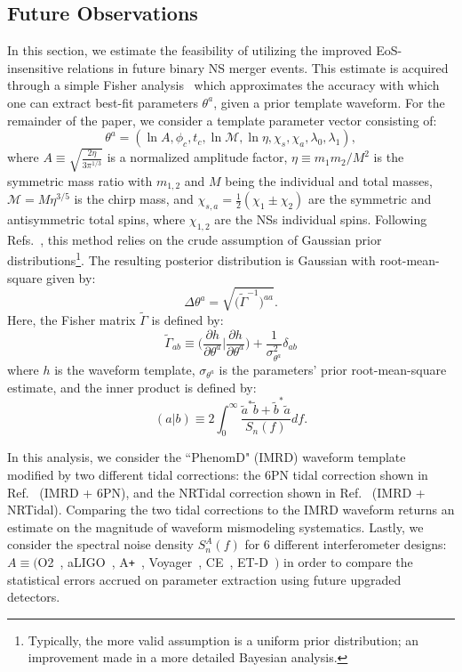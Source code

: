 \documentclass[prd,twocolumn,nofootinbib,superscriptaddress,amsmath,amssymb]{revtex4-1}
\begin{document}
\subsection{Future Observations}\label{sec:futureObservations}
In this section, we estimate the feasibility of utilizing the improved EoS-insensitive relations in future binary NS merger events.
This estimate is acquired through a simple Fisher analysis~\cite{Finn:Fisher,Cutler:Fisher} which approximates the accuracy with which one can extract best-fit parameters $\theta^a$, given a prior template waveform.
For the remainder of the paper, we consider a template parameter vector consisting of:
\begin{equation}\label{eq:template}
\theta^a=(\ln{A},\phi_c,t_c,\ln{\mathcal{M}},\ln{\mathcal{\eta}},\chi_s,\chi_a,\lambda_0, \lambda_1),
\end{equation}
where $A \equiv \sqrt{\frac{2 \eta}{3 \pi^{1/3}}}$ is a normalized amplitude factor, $\eta \equiv m_1 m_2/M^2$ is the symmetric mass ratio with $m_{1,2}$ and $M$ being the individual and total masses, $\mathcal{M}=M \eta^{3/5}$ is the chirp mass, and $\chi_{s,a}=\frac{1}{2}(\chi_1\pm\chi_2)$ are the symmetric and antisymmetric total spins, where $\chi_{1,2}$ are the NSs individual spins. 
Following Refs.~\cite{Cutler:Fisher,Berti:Fisher,Poisson:Fisher}, this method relies on the crude assumption of Gaussian prior distributions\footnote{Typically, the more valid assumption is a uniform prior distribution; an improvement made in a more detailed Bayesian analysis.}.
The resulting posterior distribution is Gaussian with root-mean-square given by:
\begin{equation}
\Delta \theta^a=\sqrt{\Big( \tilde{\Gamma}^{-1}\Big)^{aa}}.
\end{equation}
Here, the Fisher matrix $\tilde{\Gamma}$ is defined by:
\begin{equation}
\tilde{\Gamma}_{ab} \equiv \Big( \frac{\partial h}{\partial \theta^a} \Big| \frac{\partial h}{\partial \theta^a}\Big) + \frac{1}{\sigma_{\theta^a}^2} \delta_{ab}
\end{equation}
where $h$ is the waveform template, $\sigma_{\theta^a}$ is the parameters' prior root-mean-square estimate, and the inner product is defined by:
\begin{equation}
(a|b) \equiv 2 \int^{\infty}_0\frac{\tilde{a}^*\tilde{b}+\tilde{b}^*\tilde{a}}{S_n(f)}df.
\end{equation}

In this analysis, we consider the ``PhenomD" (IMRD) waveform template~\cite{PhenomDI,PhenomDII} modified by two different tidal corrections: the 6PN tidal correction shown in Ref.~\cite{Wade:tidalCorrections} (IMRD + 6PN), and the NRTidal correction shown in Ref.~\cite{Samajdar:NRTidal} (IMRD + NRTidal).
Comparing the two tidal corrections to the IMRD waveform returns an estimate on the magnitude of waveform mismodeling systematics.
Lastly, we consider the spectral noise density $S_n^A(f)$ for 6 different interferometer designs: $A \equiv ($O2~\cite{aLIGO}, aLIGO~\cite{aLIGO}, A\texttt{+}~\cite{Ap_Voyager_CE}, Voyager~\cite{Ap_Voyager_CE}, CE~\cite{ET}, ET-D~\cite{Ap_Voyager_CE}$)$ in order to compare the statistical errors accrued on parameter extraction using future upgraded detectors.
\end{document}
